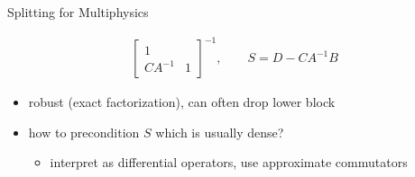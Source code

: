 \begin{frame}{Splitting for Multiphysics}
\begin{itemize}
\begin{align*}
      \begin{bmatrix}
        1 & \\ CA^{-1} & 1
      \end{bmatrix}^{-1}, \qquad
      S = D - C A^{-1} B
    \end{align*}
    \begin{itemize}
    \item robust (exact factorization), can often drop lower block
    \item how to precondition $S$ which is usually dense?
      \begin{itemize}
      \item interpret as differential operators, use approximate commutators
      \end{itemize}
    \end{itemize}
  \end{itemize}
\end{frame}
